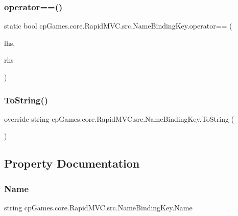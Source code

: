 \subsubsection{\texorpdfstring{operator==()}{operator==()}}
{\footnotesize\ttfamily static bool cp\+Games.\+core.\+Rapid\+M\+V\+C.\+src.\+Name\+Binding\+Key.\+operator== (\begin{DoxyParamCaption}\item[{\mbox{\hyperlink{classcp_games_1_1core_1_1_rapid_m_v_c_1_1src_1_1_name_binding_key}{Name\+Binding\+Key}}}]{lhs,  }\item[{\mbox{\hyperlink{interfacecp_games_1_1core_1_1_rapid_m_v_c_1_1_i_binding_key}{I\+Binding\+Key}}}]{rhs }\end{DoxyParamCaption})\hspace{0.3cm}{\ttfamily [static]}}

\mbox{\label{classcp_games_1_1core_1_1_rapid_m_v_c_1_1src_1_1_name_binding_key_acb33fd1833d1627904e79801ca205a63}} 
\subsubsection{\texorpdfstring{ToString()}{ToString()}}
{\footnotesize\ttfamily override string cp\+Games.\+core.\+Rapid\+M\+V\+C.\+src.\+Name\+Binding\+Key.\+To\+String (\begin{DoxyParamCaption}{ }\end{DoxyParamCaption})}



\subsection{Property Documentation}
\mbox{\label{classcp_games_1_1core_1_1_rapid_m_v_c_1_1src_1_1_name_binding_key_a336d3b40077138d51fb212817854346d}} 
\subsubsection{\texorpdfstring{Name}{Name}}
{\footnotesize\ttfamily string cp\+Games.\+core.\+Rapid\+M\+V\+C.\+src.\+Name\+Binding\+Key.\+Name\hspace{0.3cm}{\ttfamily [get]}}



